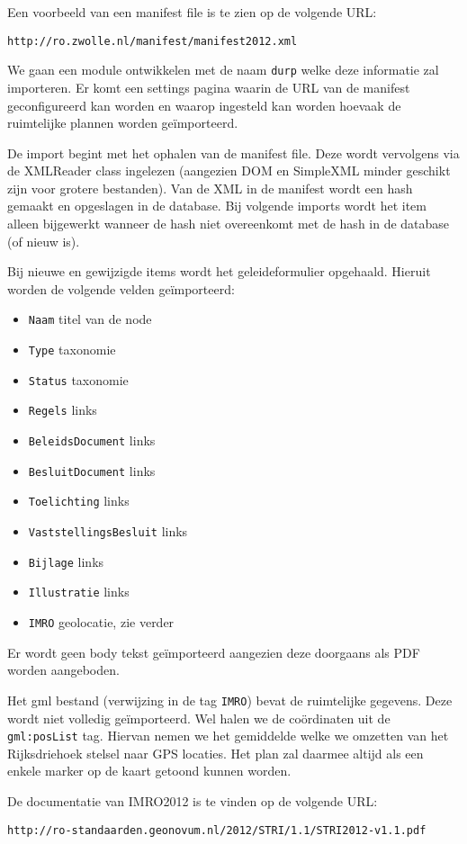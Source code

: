 Een voorbeeld van een manifest file is te zien op de volgende URL:
\begin{verbatim}
http://ro.zwolle.nl/manifest/manifest2012.xml
\end{verbatim}

We gaan een module ontwikkelen met de naam \texttt{durp} welke deze informatie zal importeren. Er komt een settings pagina waarin de URL van de manifest geconfigureerd kan worden en waarop ingesteld kan worden hoevaak de ruimtelijke plannen worden ge\"{i}mporteerd.

De import begint met het ophalen van de manifest file. Deze wordt vervolgens via de XMLReader class ingelezen (aangezien DOM en SimpleXML minder geschikt zijn voor grotere bestanden). Van de XML in de manifest wordt een hash gemaakt en opgeslagen in de database. Bij volgende imports wordt het item alleen bijgewerkt wanneer de hash niet overeenkomt met de hash in de database (of nieuw is).

Bij nieuwe en gewijzigde items wordt het geleideformulier opgehaald. Hieruit worden de volgende velden ge\"{i}mporteerd:
\begin{itemize}
\item \texttt{Naam} titel van de node
\item \texttt{Type} taxonomie
\item \texttt{Status} taxonomie
\item \texttt{Regels} links
\item \texttt{BeleidsDocument} links
\item \texttt{BesluitDocument} links
\item \texttt{Toelichting} links
\item \texttt{VaststellingsBesluit} links
\item \texttt{Bijlage} links
\item \texttt{Illustratie} links
\item \texttt{IMRO} geolocatie, zie verder
\end{itemize}
Er wordt geen body tekst ge\"{i}mporteerd aangezien deze doorgaans als PDF worden aangeboden.

Het gml bestand (verwijzing in de tag \texttt{IMRO}) bevat de ruimtelijke gegevens. Deze wordt niet volledig ge\"{i}mporteerd. Wel halen we de co\"{o}rdinaten uit de \texttt{gml:posList} tag. Hiervan nemen we het gemiddelde welke we omzetten van het Rijksdriehoek stelsel naar GPS locaties. Het plan zal daarmee altijd als een enkele marker op de kaart getoond kunnen worden.

De documentatie van IMRO2012 is te vinden op de volgende URL:
\begin{verbatim}
http://ro-standaarden.geonovum.nl/2012/STRI/1.1/STRI2012-v1.1.pdf
\end{verbatim}





